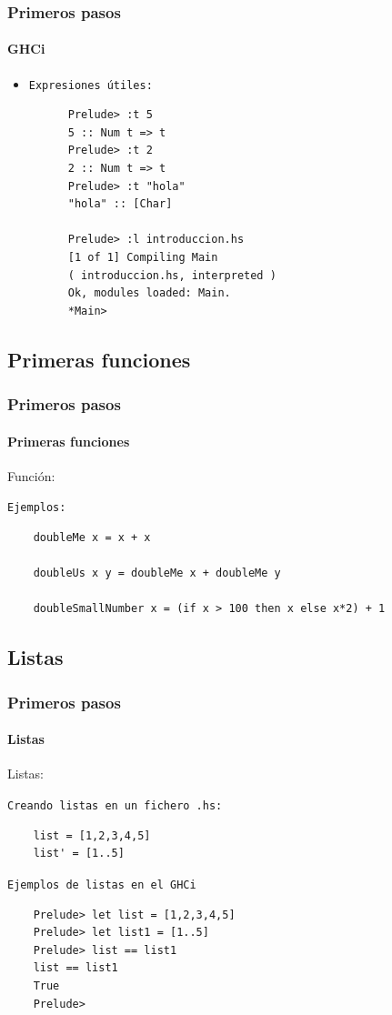 \documentclass{beamer}
\begin{document}
\begin{frame}[fragile]
  \frametitle{Primeros pasos}
  \framesubtitle{GHCi}
  \begin{itemize}
  \item\texttt{Expresiones útiles:}
    \begin{verbatim}
      Prelude> :t 5
      5 :: Num t => t
      Prelude> :t 2
      2 :: Num t => t
      Prelude> :t "hola"
      "hola" :: [Char]

      Prelude> :l introduccion.hs
      [1 of 1] Compiling Main
      ( introduccion.hs, interpreted )
      Ok, modules loaded: Main.
      *Main>
    \end{verbatim}
  \end{itemize}
\end{frame}

\subsection{Primeras funciones}
\begin{frame}[fragile]
  \frametitle{Primeros pasos}
  \framesubtitle{Primeras funciones}
  \begin{block}{Función:}

  \end{block}
  \texttt{Ejemplos:}
  \begin{verbatim}
    doubleMe x = x + x

    doubleUs x y = doubleMe x + doubleMe y

    doubleSmallNumber x = (if x > 100 then x else x*2) + 1
  \end{verbatim}
\end{frame}

\subsection{Listas}
\begin{frame}[fragile]
  \frametitle{Primeros pasos}
  \framesubtitle{Listas}
  \begin{block}{Listas:}
  \end{block}
  \texttt{Creando listas en un fichero \verb~.hs~:}
  \begin{verbatim}
    list = [1,2,3,4,5]
    list' = [1..5]
  \end{verbatim}
  \texttt{Ejemplos de listas en el GHCi}
  \begin{verbatim}
    Prelude> let list = [1,2,3,4,5]
    Prelude> let list1 = [1..5]
    Prelude> list == list1
    list == list1
    True
    Prelude>
  \end{verbatim}
\end{frame}
\end{document}
